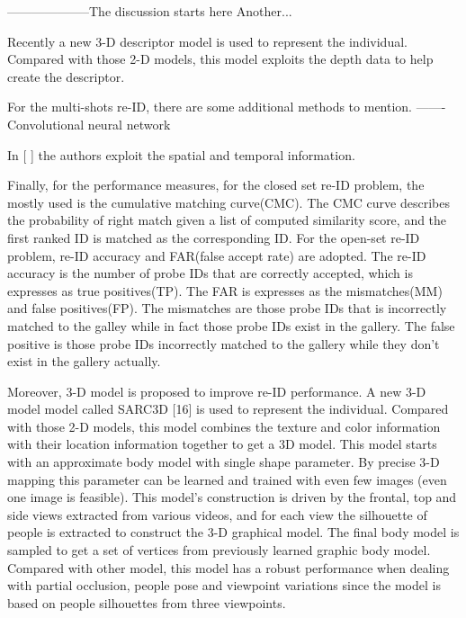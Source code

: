 --------------------The discussion starts here
Another...

Recently a new 3-D descriptor model is used to represent the individual. Compared with those 2-D models, this model exploits the depth data to help create the descriptor.

For the multi-shots re-ID, there are some additional methods to mention. ------- 
Convolutional neural network

In [ ] the authors exploit the spatial and temporal information.


Finally, for the performance measures, for the closed set re-ID problem, the mostly used is the cumulative matching curve(CMC). The CMC curve describes the probability of right match given a list of computed similarity score, and the first ranked ID is matched as the corresponding ID. For the open-set re-ID problem, re-ID accuracy and FAR(false accept rate) are adopted. The re-ID accuracy is the number of probe IDs that are correctly accepted, which is expresses as true positives(TP). The FAR is expresses as the mismatches(MM) and false positives(FP). The mismatches are those probe IDs that is incorrectly matched to the galley while in fact those probe IDs exist in the gallery. The false positive is those probe IDs incorrectly matched to the gallery while they don't exist in the gallery actually.




Moreover, 3-D model is proposed to improve re-ID performance. A new 3-D model model called SARC3D [16] is used to represent the individual. Compared with those 2-D models, this model combines the texture and color information with their location information together to get a 3D model. This model starts with an approximate body model with single shape parameter. By precise 3-D mapping this parameter can be learned and trained with even few images (even one image is feasible). This model's construction is driven by the frontal, top and side views extracted from various videos, and for each view the silhouette of people is extracted to construct the 3-D graphical model. The final body model is sampled to get a set of vertices from previously learned graphic body model. Compared with other model, this model has a robust performance when dealing with partial occlusion, people pose and viewpoint variations since the model is based on people silhouettes from three viewpoints.


